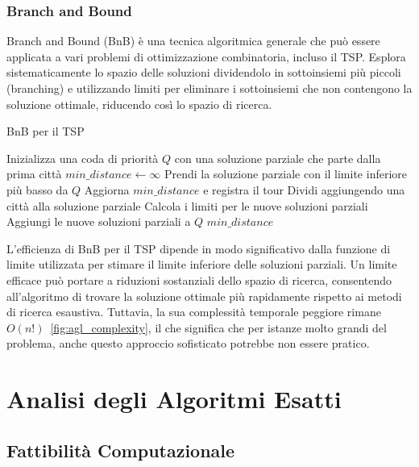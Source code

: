 \subsubsection{Branch and Bound}

Branch and Bound (\gls{BnB}) è una tecnica algoritmica generale che può essere applicata a vari problemi di ottimizzazione combinatoria, incluso il \gls{TSP}. Esplora sistematicamente lo spazio delle soluzioni dividendolo in sottoinsiemi più piccoli (branching) e utilizzando limiti per eliminare i sottoinsiemi che non contengono la soluzione ottimale, riducendo così lo spazio di ricerca.

\begin{algorithm}
	\caption{\gls{BnB} per il \gls{TSP}}\label{branchbound}
	\begin{algorithmic}[1]
		\State Inizializza una coda di priorità $Q$ con una soluzione parziale che parte dalla prima città
		\State $min\_distance \gets \infty$
		\State Prendi la soluzione parziale con il limite inferiore più basso da $Q$
		\State Aggiorna $min\_distance$ e registra il tour
		\EndIf
		\Else
		\State Dividi aggiungendo una città alla soluzione parziale
		\State Calcola i limiti per le nuove soluzioni parziali
		\State Aggiungi le nuove soluzioni parziali a $Q$
		\EndIf
		\EndWhile
		\State \Return $min\_distance$
		\EndProcedure
	\end{algorithmic}
\end{algorithm}

L'efficienza di \gls{BnB} per il \gls{TSP} dipende in modo significativo dalla funzione di limite utilizzata per stimare il limite inferiore delle soluzioni parziali. Un limite efficace può portare a riduzioni sostanziali dello spazio di ricerca, consentendo all'algoritmo di trovare la soluzione ottimale più rapidamente rispetto ai metodi di ricerca esaustiva. Tuttavia, la sua complessità temporale peggiore rimane $O(n!)$~\ref{fig:agl_complexity}, il che significa che per istanze molto grandi del problema, anche questo approccio sofisticato potrebbe non essere pratico.

\section{Analisi degli Algoritmi Esatti}

\subsection{Fattibilità Computazionale}

